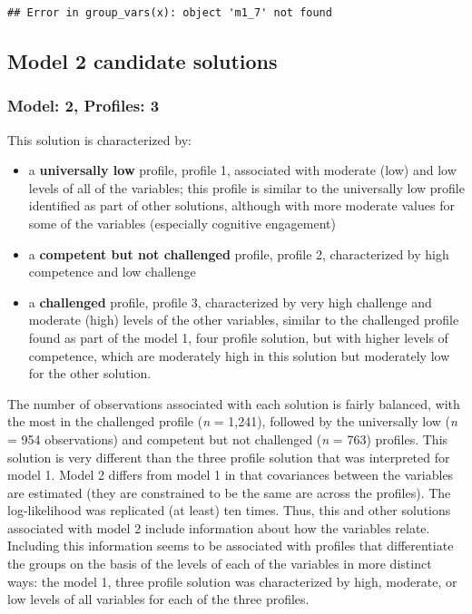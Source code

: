 \documentclass[]{book}
\providecommand{\tightlist}{%
  \setlength{\itemsep}{0pt}\setlength{\parskip}{0pt}}
\theoremstyle{definition}
\theoremstyle{definition}
\theoremstyle{definition}
\theoremstyle{remark}
\begin{document}
\begin{verbatim}
## Error in group_vars(x): object 'm1_7' not found
\end{verbatim}

\subsection{Model 2 candidate
solutions}\label{model-2-candidate-solutions}

\subsubsection{Model: 2, Profiles: 3}\label{model-2-profiles-3}

This solution is characterized by:

\begin{itemize}
\tightlist
\item
  a \textbf{universally low} profile, profile 1, associated with
  moderate (low) and low levels of all of the variables; this profile is
  similar to the universally low profile identified as part of other
  solutions, although with more moderate values for some of the
  variables (especially cognitive engagement)
\item
  a \textbf{competent but not challenged} profile, profile 2,
  characterized by high competence and low challenge
\item
  a \textbf{challenged} profile, profile 3, characterized by very high
  challenge and moderate (high) levels of the other variables, similar
  to the challenged profile found as part of the model 1, four profile
  solution, but with higher levels of competence, which are moderately
  high in this solution but moderately low for the other solution.
\end{itemize}

The number of observations associated with each solution is fairly
balanced, with the most in the challenged profile (\emph{n} = 1,241),
followed by the universally low (\emph{n} = 954 observations) and
competent but not challenged (\emph{n} = 763) profiles. This solution is
very different than the three profile solution that was interpreted for
model 1. Model 2 differs from model 1 in that covariances between the
variables are estimated (they are constrained to be the same are across
the profiles). The log-likelihood was replicated (at least) ten times.
Thus, this and other solutions associated with model 2 include
information about how the variables relate. Including this information
seems to be associated with profiles that differentiate the groups on
the basis of the levels of each of the variables in more distinct ways:
the model 1, three profile solution was characterized by high, moderate,
or low levels of all variables for each of the three profiles.
\end{document}
